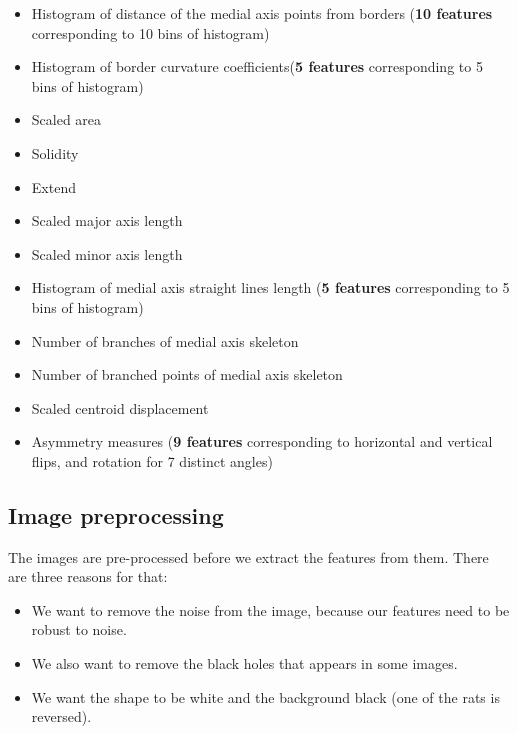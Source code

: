 \documentclass[12pt]{article}
\begin{document}
\begin{itemize}
	\item Histogram of distance of the medial axis points from borders (\textbf{10 features} corresponding to 10 bins of histogram)
	\item Histogram of border curvature coefficients(\textbf{5 features} corresponding to 5 bins of histogram)
	\item Scaled area
	\item Solidity
	\item Extend
	\item Scaled major axis length
	\item Scaled minor axis length
	\item Histogram of medial axis straight lines length (\textbf{5 features} corresponding to 5 bins of histogram)
	\item Number of branches of medial axis skeleton
	\item Number of branched points of medial axis skeleton
	\item Scaled centroid displacement
	\item Asymmetry measures (\textbf{9 features} corresponding to horizontal and vertical flips, and rotation for 7 distinct angles)
\end{itemize} 

\subsection{Image preprocessing}
The images are pre-processed before we extract the features from them. There are three reasons for that:
\begin{itemize}
	\item We want to remove the noise from the image, because our features need to be robust to noise.
        \item We also want to remove the black holes that appears in some images.
        \item We want the shape to be white and the background black (one of the rats is reversed).
\end{itemize}
\end{document}
